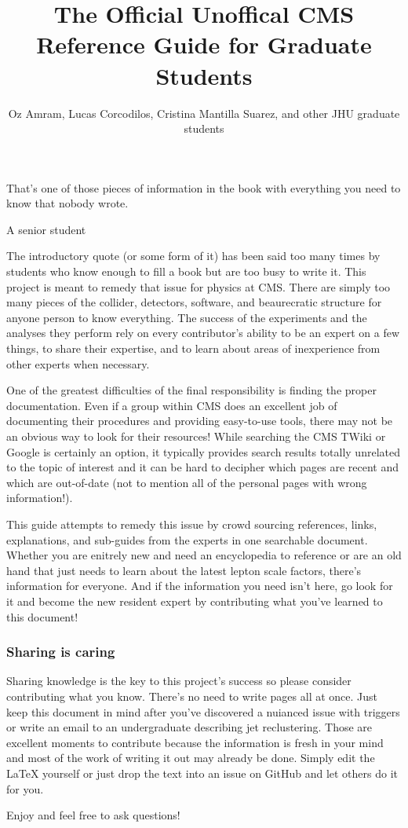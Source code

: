 \documentclass{article}
\begin{document}
\title{The Official Unoffical CMS Reference Guide for Graduate Students}
\author{Oz Amram, Lucas Corcodilos, Cristina Mantilla Suarez, and other JHU graduate students}

\maketitle

\epigraph{That's one of those pieces of information in the book with everything you need to know that nobody wrote.}{A senior student}

The introductory quote (or some form of it) has been said too many times by students who know enough to fill a book but are too busy to write it. This project is meant to remedy that issue for physics at CMS. There are simply too many pieces of the collider, detectors, software, and beaurecratic structure for anyone person to know everything. The success of the experiments and the analyses they perform rely on every contributor's ability to be an expert on a few things, to share their expertise, and to learn about areas of inexperience from other experts when necessary. 

One of the greatest difficulties of the final responsibility is finding the proper documentation. Even if a group within CMS does an excellent job of documenting their procedures and providing easy-to-use tools, there may not be an obvious way to look for their resources! While searching the CMS TWiki or Google is certainly an option, it typically provides search results totally unrelated to the topic of interest and it can be hard to decipher which pages are recent and which are out-of-date (not to mention all of the personal pages with wrong information!). 

This guide attempts to remedy this issue by crowd sourcing references, links, explanations, and sub-guides from the experts in one searchable document. Whether you are enitrely new and need an encyclopedia to reference or are an old hand that just needs to learn about the latest lepton scale factors, there's information for everyone. And if the information you need isn't here, go look for it and become the new resident expert by contributing what you've learned to this document! 

\subsubsection{Sharing is caring}
Sharing knowledge is the key to this project's success so please consider contributing what you know. There's no need to write pages all at once. Just keep this document in mind after you've discovered a nuianced issue with triggers or write an email to an undergraduate describing jet reclustering. Those are excellent moments to contribute because the information is fresh in your mind and most of the work of writing it out may already be done. Simply edit the LaTeX yourself or just drop the text into an issue on GitHub and let others do it for you.

Enjoy and feel free to ask questions!


\end{document}
